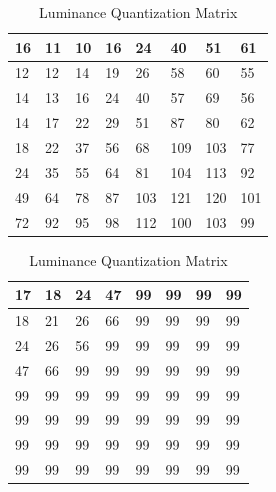 \documentclass{l4proj}
\begin{document}
\begin{table}[!htb]
    \caption{Default Quantization Tables for Chrominance and Luminance components - Tables reconstructed from those presented by \citet{attaby_2021}}
    \begin{minipage}{.5\linewidth}
      \caption{Chrominance Quantization Matrix}
      \centering
        \begin{tabular}{|l|l|l|l|l|l|l|l|}
            \hline
            16 & 11 & 10 & 16 & 24  & 40  & 51  & 61  \\ \hline
            12 & 12 & 14 & 19 & 26  & 58  & 60  & 55  \\ \hline
            14 & 13 & 16 & 24 & 40  & 57  & 69  & 56  \\ \hline
            14 & 17 & 22 & 29 & 51  & 87  & 80  & 62  \\ \hline
            18 & 22 & 37 & 56 & 68  & 109 & 103 & 77  \\ \hline
            24 & 35 & 55 & 64 & 81  & 104 & 113 & 92  \\ \hline
            49 & 64 & 78 & 87 & 103 & 121 & 120 & 101 \\ \hline
            72 & 92 & 95 & 98 & 112 & 100 & 103 & 99  \\ \hline
        \end{tabular}
    \end{minipage}%
    \begin{minipage}{.5\linewidth}
      \centering
        \caption{Luminance Quantization Matrix}
        \begin{tabular}{|l|l|l|l|l|l|l|l|}
            \hline
            17 & 18 & 24 & 47 & 99 & 99 & 99 & 99 \\ \hline
            18 & 21 & 26 & 66 & 99 & 99 & 99 & 99 \\ \hline
            24 & 26 & 56 & 99 & 99 & 99 & 99 & 99 \\ \hline
            47 & 66 & 99 & 99 & 99 & 99 & 99 & 99 \\ \hline
            99 & 99 & 99 & 99 & 99 & 99 & 99 & 99 \\ \hline
            99 & 99 & 99 & 99 & 99 & 99 & 99 & 99 \\ \hline
            99 & 99 & 99 & 99 & 99 & 99 & 99 & 99 \\ \hline
            99 & 99 & 99 & 99 & 99 & 99 & 99 & 99 \\ \hline
            \end{tabular}
    \end{minipage} 
    \label{q_matrices}
\end{table}
\end{document}
